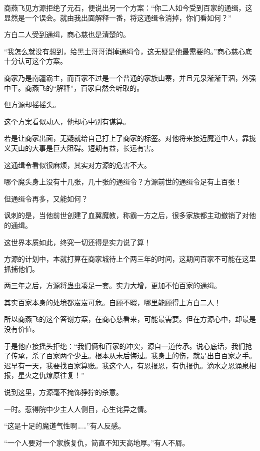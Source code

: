 
\begin{this_body}



商燕飞见方源拒绝了元石，便说出另一个方案：“你二人如今受到百家的通缉，这显然是一个误会。就由我出面解释一番，将这通缉令消掉，你们看如何？”

方白二人受到通缉，商心慈也是清楚的。

“我怎么就没有想到，给黑土哥哥消掉通缉令，这无疑是他最需要的。”商心慈心底十分认可这个方案。

商家乃是南疆霸主，而百家不过是一个普通的家族山寨，并且元泉渐渐干涸，外强中干。商燕飞的“解释”，百家自然会听取的。

但方源却摇摇头。

这个方案看似动人，他却心中别有谋算。

若是让商家出面，无疑就给自己打上了商家的标签。对他将来接近魔道中人，靠拢义天山的大事是巨大阻碍。短期有益，长远有害。

这通缉令看似很麻烦，其实对方源的危害不大。

哪个魔头身上没有十几张，几十张的通缉令？方源前世的通缉令足有上百张！

但通缉令再多，又能如何？

讽刺的是，当他前世创建了血翼魔教，称霸一方之后，很多家族都主动撤销了对他的通缉。

这世界本质如此，终究一切还得是实力说了算！

方源的计划中，本就打算在商家城待上个两三年的时间，这期间百家不可能在这里抓捕他们。

两三年之后，方源将蛊虫凑足一套。实力大增，更加不怕百家的通缉。

其实百家本身的处境都岌岌可危。自顾不暇，哪里能顾得上方白二人！

所以商燕飞的这个答谢方案，在商心慈看来，可能最需要。但在方源心中，却最是没有价值。

于是他直接摇头拒绝：“我们俩和百家的冲突，源自一道传承。说心底话，我们抢了传承，杀了百家两个少主。根本从未后悔过。我身上的伤，就是出自百家之手。迟早有一天，我要找百家算账。我这个人，有恩报恩，有仇报仇。滴水之恩涌泉相报，星火之仇燎原往复！”

说到这里，方源毫不掩饰狰狞的杀意。

一时。惹得院中少主人人侧目，心生诧异之情。

“这是十足的魔道气性啊……”有人反感。

“一个人要对一个家族复仇，简直不知天高地厚。”有人不屑。


\end{this_body}

